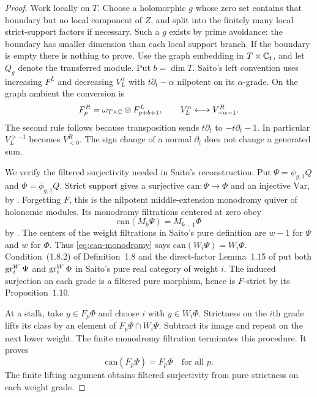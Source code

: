 \begin{proof}
Work locally on \(T\).  Choose a holomorphic \(g\) whose zero set
contains that boundary but no local component of \(Z\), and split into
the finitely many local strict-support factors if necessary.  Such a
\(g\) exists by prime avoidance: the boundary has smaller dimension
than each local support branch.  If the boundary is empty there is
nothing to prove.  Use the graph embedding in \(T\times\mathbb C_t\), and let
\(Q_g\) denote the transferred module.  Put \(b=\dim T\).  Saito's
left convention uses increasing \(F^L\) and decreasing \(V_L^\alpha\)
with \(t\partial_t-\alpha\) nilpotent on its \(\alpha\)-grade.  On the
graph ambient the conversion is
\begin{equation}\label{eq:graph-side-change}
 F_p^R=\omega_{T\times\mathbb C}\otimes F^L_{p+b+1},
 \qquad V_L^\alpha\longleftrightarrow V^R_{-\alpha-1}.
\end{equation}
The second rule follows because transposition sends
\(t\partial_t\) to \(-t\partial_t-1\).  In particular
\(V_L^{>-1}\) becomes \(V^R_{<0}\).  The sign change of a normal
\(\partial_t\) does not change a generated sum.

We verify the filtered surjectivity needed in Saito's reconstruction.
Put \(\Psi=\psi_{g,1}Q\) and \(\Phi=\phi_{g,1}Q\).  Strict support
gives a surjective \(\mathrm{can}:\Psi\to\Phi\) and an injective
\(\mathrm{Var}\), by \cite[Proposition~1.5]{Saito1990Kahler}.  Forgetting
\(F\), this is the nilpotent middle-extension monodromy quiver of
holonomic modules.  Its
monodromy filtrations centered at zero obey
\begin{equation}\label{eq:can-monodromy}
 \mathrm{can}(M_k\Psi)=M_{k-1}\Phi
\end{equation}
by \cite[Lemma~3.3.13]{SabbahSchnell2026}.  The centers of the weight
filtrations in Saito's pure definition are \(w-1\) for \(\Psi\) and
\(w\) for \(\Phi\).  Thus \eqref{eq:can-monodromy} says
\(\mathrm{can}(W_i\Psi)=W_i\Phi\).  Condition~(1.8.2) of Definition~1.8 and the
direct-factor Lemma~1.15 of \cite{Saito1990Kahler} put both
\(\operatorname{gr}_i^W\Psi\) and \(\operatorname{gr}_i^W\Phi\) in Saito's pure real category of
weight \(i\).  The induced surjection on each grade is a filtered pure
morphism, hence is \(F\)-strict by its Proposition~1.10.

At a stalk, take \(y\in F_p\Phi\) and choose \(i\) with \(y\in W_i\Phi\).
Strictness on the \(i\)th grade lifts its class by an element of
\(F_p\Psi\cap W_i\Psi\).  Subtract its image and repeat on the next
lower weight.  The finite monodromy filtration terminates this procedure.
It proves
\[
 \mathrm{can}(F_p\Psi)=F_p\Phi\quad\text{for all }p.
\]
The finite lifting argument obtains filtered surjectivity from pure
strictness on each weight grade.


\end{proof}
